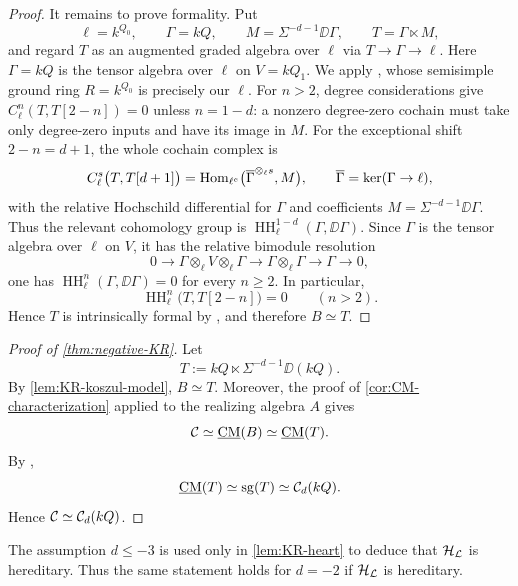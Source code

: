 \documentclass[11pt,a4paper,dvipsnames,x11names]{amsart}
\begin{document}
\begin{proof}
    It remains to prove formality. Put
    \[
    \ell=k^{Q_0},
    \qquad
    \Gamma=kQ,
    \qquad
    M=\Sigma^{-d-1}\DD\Gamma,
    \qquad
    T=\Gamma\ltimes M,
    \]
    and regard $T$ as an augmented graded algebra over $\ell$ via $T\to\Gamma\to\ell$. Here $\Gamma=kQ$ is the tensor algebra over $\ell$ on $V=kQ_1$. We apply \cite[Theorem~4.7]{SeidelThomas01}, whose semisimple ground ring $R=k^{Q_0}$ is precisely our $\ell$. For $n>2$, degree considerations give $C^n_{\ell}(T,T[2-n])=0$ unless $n=1-d$: a nonzero degree-zero cochain must take only degree-zero inputs and have its image in $M$. For the exceptional shift $2-n=d+1$, the whole cochain complex is
    \[
    C^s_{\ell}\bigl(T,T[d+1]\bigr)=\operatorname{Hom}_{\ell^e}\bigl(\overline\Gamma^{\otimes_{\ell}s},M\bigr),
    \qquad \overline\Gamma=\ker(\Gamma\to\ell),
    \]
    with the relative Hochschild differential for $\Gamma$ and coefficients $M=\Sigma^{-d-1}\DD\Gamma$. Thus the relevant cohomology group is $\operatorname{HH}^{1-d}_{\ell}(\Gamma,\DD\Gamma)$. Since $\Gamma$ is the tensor algebra over $\ell$ on $V$, it has the relative bimodule resolution
    \[
        0\longrightarrow
        \Gamma\otimes_{\ell}V\otimes_{\ell}\Gamma
        \longrightarrow
        \Gamma\otimes_{\ell}\Gamma
        \longrightarrow
        \Gamma
        \longrightarrow0,
    \]
    one has $\operatorname{HH}^{n}_{\ell}(\Gamma,\DD\Gamma)=0$ for every $n\geq2$. In particular,
    \[
    \operatorname{HH}^{n}_{\ell}\bigl(T,T[2-n]\bigr)=0
    \qquad(n>2).
    \]
    Hence $T$ is intrinsically formal by \cite[Theorem~4.7]{SeidelThomas01}, and therefore $B\simeq T$.
\end{proof}

\begin{proof}[Proof of \cref{thm:negative-KR}]
    Let
    \[
        T:=kQ\ltimes \Sigma^{-d-1}\DD(kQ).
    \]
    By \cref{lem:KR-koszul-model}, $B\simeq T$. Moreover, the proof of \cref{cor:CM-characterization} applied to the realizing algebra $A$ gives
    \[
        \mathcal C\simeq\underline{\operatorname{CM}}(B)\simeq\underline{\operatorname{CM}}(T).
    \]
    By \cite[Theorem~2.4 and Proposition~6.3]{Jin20},
    \[
        \underline{\operatorname{CM}}(T)\simeq\operatorname{sg}(T)\simeq\mathcal C_d(kQ).
    \]
    Hence $\mathcal C\simeq\mathcal C_d(kQ)$.
\end{proof}

\begin{rmk}\label{rmk:d-minus-2}
    The assumption $d\leq-3$ is used only in \cref{lem:KR-heart} to deduce that $\mathcal H_\mathcal L$ is hereditary. Thus the same statement holds for $d=-2$ if $\mathcal H_\mathcal L$ is hereditary.
\end{rmk}
\end{document}
